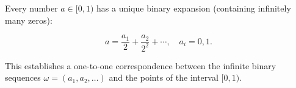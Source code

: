 Every number $a \in [0, 1)$ has a unique binary expansion (containing infinitely many zeros):

$$a = \frac{a_1}{2} + \frac{a_2}{2^2} + \cdots, \quad a_i = 0, 1.$$

This establishes a one-to-one correspondence between the infinite binary sequences $\omega = (a_1, a_2, \ldots)$ and the points of the interval $[0, 1)$.

